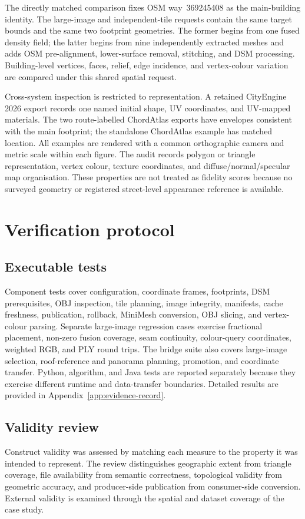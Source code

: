 The directly matched comparison fixes OSM way~369245408 as the main-building
identity.  The large-image and independent-tile requests contain the same
target bounds and the same two footprint geometries.  The former begins from
one fused density field; the latter begins from nine independently extracted
meshes and adds OSM pre-alignment, lower-surface removal, stitching, and DSM
processing.  Building-level vertices, faces, relief, edge incidence, and
vertex-colour variation are compared under this shared spatial request.

Cross-system inspection is restricted to representation.  A retained
CityEngine 2026 export records one named initial shape, UV coordinates, and
UV-mapped materials.  The two
route-labelled ChordAtlas exports have envelopes consistent with the main
footprint; the standalone
ChordAtlas example has matched location.  All examples are
rendered with a common orthographic camera and metric scale within each figure.
The audit records polygon or triangle representation, vertex colour, texture
coordinates, and diffuse/normal/specular map organisation.  These properties
are not treated as fidelity scores because no surveyed geometry or registered
street-level appearance reference is available.

\section{Verification protocol}

\subsection{Executable tests}

Component tests cover configuration, coordinate frames, footprints, DSM
prerequisites, OBJ inspection, tile planning, image integrity, manifests,
cache freshness, publication, rollback, MiniMesh conversion, OBJ slicing, and
vertex-colour parsing.  Separate large-image regression cases exercise
fractional placement, non-zero fusion coverage, seam continuity, colour-query
coordinates, weighted RGB, and PLY round trips.  The bridge suite also covers
large-image selection, roof-reference and panorama planning, promotion, and
coordinate transfer.  Python, algorithm, and Java tests are reported
separately because they exercise different runtime and data-transfer
boundaries.  Detailed results are provided in
Appendix~\ref{app:evidence-record}.

\subsection{Validity review}

Construct validity was assessed by matching each measure to the property it
was intended to represent.  The review distinguishes geographic extent from
triangle coverage, file availability from semantic correctness, topological
validity from geometric accuracy, and producer-side publication from
consumer-side conversion.  External validity is examined through the spatial
and dataset coverage of the case study.

